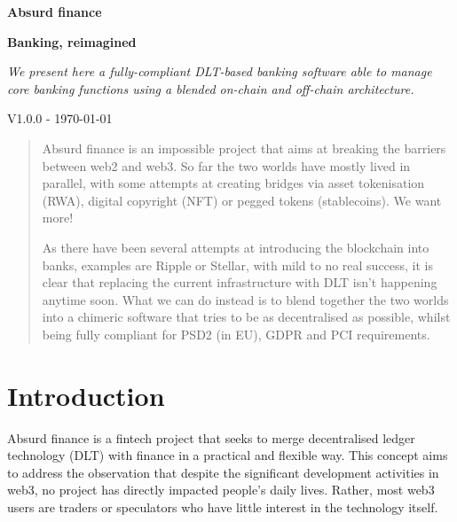 \documentclass[a4paper,10 pt]{article}
\theoremstyle{definition}
\begin{document}
\begin{titlepage}
    \begin{center}
        \vspace*{1cm}
            
        \Huge
        \textbf{Absurd finance}

        \vspace{0.5cm}
        \Large
        {\bf Banking, reimagined}

        \vspace{1cm}
        \Large
        {\it We present here a fully-compliant DLT-based banking software able to manage core banking functions using a blended on-chain and off-chain architecture.}

        \vspace{1.5cm}
        {\normalsize V1.0.0 - \today}
        \vspace{1.0cm}

        \begin{abstract}        
        Absurd finance is an impossible project that aims at breaking the barriers between web2 and web3. So far the two worlds have mostly lived in parallel, with some attempts at creating bridges via asset tokenisation (RWA), digital copyright (NFT) or pegged tokens (stablecoins).
        We want more!
        
        As there have been several attempts at introducing the blockchain into banks, examples are Ripple or Stellar, with mild to no real success, it is clear that replacing the current infrastructure with DLT isn't happening anytime soon. What we can do instead is to blend together the two worlds into a chimeric software that tries to be as decentralised as possible, whilst being fully compliant for PSD2 (in EU), GDPR and PCI requirements.        
        \end{abstract}
            
    \end{center}
\tableofcontents
\end{titlepage}

\section{Introduction}

Absurd finance is a fintech project that seeks to merge decentralised ledger technology (DLT) with finance in a practical and flexible way. This concept aims to address the observation that despite the significant development activities in web3, no project has directly impacted people's daily lives. Rather, most web3 users are traders or speculators who have little interest in the technology itself.  
\end{document}
